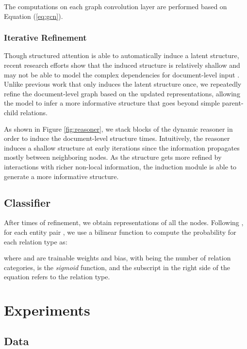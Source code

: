 \documentclass[11pt,a4paper]{article}
\begin{document}
The computations on each graph convolution layer are performed based on Equation (\ref{eq:gcn}).
\fi
\iffalse

\fi


\subsubsection{Iterative Refinement}
\label{ssec:3.2.3}
Though structured attention \citep{Kim2017StructuredAN, Liu2017LearningST} is able to automatically induce a latent structure, recent research efforts show that the induced structure is relatively shallow and may not be able to model the complex dependencies for document-level input \citep{Liu2019SingleDS, ferracane2019evaluating}. 
Unlike previous work \citep{Liu2017LearningST} that only induces the latent structure once, we repeatedly refine the document-level graph based on the updated representations, allowing the model to infer a more informative structure that goes beyond simple parent-child relations.

As shown in Figure \ref{fig:reasoner}, we stack  blocks of the dynamic reasoner in order to induce the document-level structure  times. Intuitively, the reasoner induces a shallow structure at early iterations since the information propagates mostly between neighboring nodes. As the structure gets more refined by interactions with richer non-local information, the induction module is able to generate a more informative structure.


\subsection{Classifier}
After  times of refinement, we obtain representations of all the nodes. Following \citet{yao2019DocRED}, for each entity pair , we use a bilinear function to compute the probability for each relation type  as:

where  and  are trainable weights and bias, with  being the number of relation categories,  is the \textit{sigmoid} function, and the subscript  in the right side of the equation refers to the relation type.   \section{Experiments}
\label{sec:4}

\subsection{Data}
\label{ssec:4.1}
\end{document}
